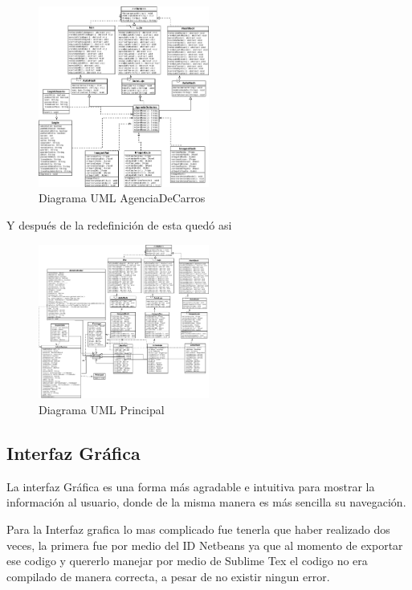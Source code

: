 \documentclass{article}
\begin{document}
\begin{figure}
\centering
\includegraphics[width=0.5\textwidth]{DiagramasUML/Diagrama1.png}
\caption{\label{fig:tesla}Diagrama UML AgenciaDeCarros}
\end{figure}
\clearpage

Y después de la redefinición de esta quedó asi

\begin{figure}
\centering
\includegraphics[width=0.5\textwidth]{DiagramasUML/Diagrama2.png}
\caption{\label{fig:tesla}Diagrama UML Principal}
\end{figure}


\subsection{Interfaz Gráfica}

La interfaz Gráfica es una forma más agradable e intuitiva para mostrar la información al usuario, donde de la misma manera es más sencilla su 
navegación.\newline

Para la Interfaz grafica lo mas complicado fue tenerla que haber realizado dos veces, la primera
fue por medio del ID Netbeans ya que al momento de exportar ese codigo y quererlo manejar por
medio de Sublime Tex el codigo no era compilado de manera correcta, a pesar de no existir ningun
error.
\end{document}
